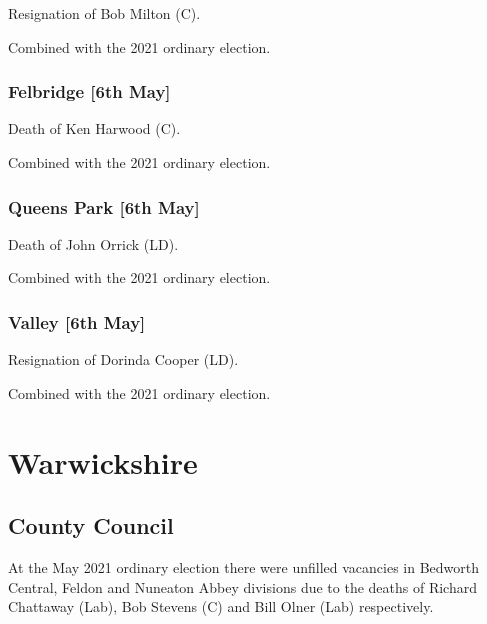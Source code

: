 \documentclass[a4paper,openany]{book}
\begin{document}
\begin{resultsiii}
Resignation of Bob Milton (C).

Combined with the 2021 ordinary election.

\subsubsection*{Felbridge \hspace*{\fill}\nolinebreak[1]%
	\enspace\hspace*{\fill}
	[6th May]}


Death of Ken Harwood (C).

Combined with the 2021 ordinary election.

\subsubsection*{Queens Park \hspace*{\fill}\nolinebreak[1]%
	\enspace\hspace*{\fill}
	[6th May]}


Death of John Orrick (LD).

Combined with the 2021 ordinary election.

\subsubsection*{Valley \hspace*{\fill}\nolinebreak[1]%
	\enspace\hspace*{\fill}
	[6th May]}


Resignation of Dorinda Cooper (LD).

Combined with the 2021 ordinary election.

\section{Warwickshire}

\subsection*{County Council}

At the May 2021 ordinary election there were unfilled vacancies in Bedworth Central, Feldon and Nuneaton Abbey divisions due to the deaths of Richard Chattaway (Lab), Bob Stevens (C) and Bill Olner (Lab) respectively.


\end{resultsiii}
\end{document}
